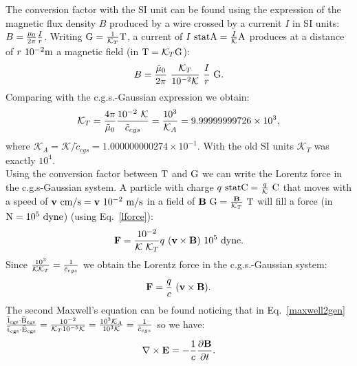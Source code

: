\documentclass[12pt,a4paper,twoside]{report}
\def\kappaa{1.000000000274\times 10^{-1}}
\def\toverg{9.99999999726\times 10^{3}}
\begin{document}
{{The conversion factor with the SI unit can be found using the expression of 
the magnetic flux density $B$ produced by a wire crossed by 
a currenit $I$ in SI units: $B={\mu_0\over 2 \pi} {I \over r}$. 
Writing ${\rm G}={1\over \mathcal{K}_T} {\rm T}$, a current of $I\ {\rm statA}= {I\over \mathcal{K}} 
{\rm A}$ produces at a distance of $r\ {10^{-2}} {\rm m}$ a magnetic field 
(in ${\rm T}=\mathcal{K}_T {\rm G}$): 
\begin{equation}
B={\tilde \mu_0\over 2 \pi}\ {\mathcal{K}_T \over
10^{-2} \mathcal{K}}\ {I\over r}\  {\rm G}.
\end{equation}
Comparing with the c.g.s.-Gaussian expression we obtain:
\begin{equation}
\mathcal{K}_T= {4 \pi \over \tilde \mu_0} {10^{-2}\ \mathcal{K} \over \tilde c_{cgs}}= 
{10^3 \over \mathcal{K}_A}=\toverg,
\end{equation}
where $\mathcal{K}_A=\mathcal{K}/\tilde c_{cgs}=\kappaa$. 
With the old SI units $\mathcal{K}_T$ was exactly $10^4$.
\\
Using the conversion factor between ${\rm T}$ and ${\rm G}$ we can write the 
Lorentz force in the c.g.s-Gaussian system. A particle with charge
$q\ {\rm statC}={q\over \mathcal{K}}\ {\rm C}$ that moves with a speed of ${\bf v}\ {\rm cm}/{\rm s}=
{\bf v}\ 10^{-2}\ {\rm m}/{\rm s}$ in a field of ${\bf B}\ {\rm G} = {{\bf B} \over \mathcal{K}_T}\ {\rm T}$ 
will fill a force (in ${\rm N}=10^5\ {\rm dyne}$) (using Eq.~\ref{lforce}):
\begin{equation}
{\bf F}={10^{-2} \over \mathcal{K}\ \mathcal{K}_T} q\ ({\bf v}\times {\bf B})\ 10^5\ {\rm dyne}. 
\end{equation}
Since ${10^{3} \over \mathcal{K} \mathcal{K}_T}=
{1\over \tilde c_{cgs}}$ we obtain the Lorentz force in the 
c.g.s.-Gaussian system:
\begin{equation}
{\bf F}={q\over c}\ ({\bf v}\times {\bf B}).
\end{equation}
The second Maxwell's equation can be found noticing that 
in Eq.~\ref{maxwell2gen}
${{\rm \bar l_{cgs}}\cdot {\rm \bar B_{cgs}} \over {\rm \bar t_{cgs}}\cdot {\rm \bar E_{cgs}}}=
{10^{-2} \over \mathcal{K}_T 10^{-5} \mathcal{K}}={10^3 \mathcal{K}_A \over 10^3 \mathcal{K}}={1\over 
\tilde c_{cgs}}$ so we have:
\begin{equation}
\nabla \times {\bf E}=-{1\over c}
{\partial {\bf B} \over \partial t}.
\label{maxwell2cgs}
\end{equation}
}
\\

}
\end{document}
